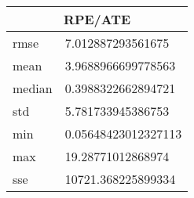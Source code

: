 \begin{table}[!ht] 
 \centering 
 \begin{tabular}{|l|l|} \hline 
 \multicolumn{2}{|c|}{RPE/ATE} \\ \hline 
 rmse & 7.012887293561675 \\ \hline 
mean & 3.9688966699778563 \\ \hline 
median & 0.3988322662894721 \\ \hline 
std & 5.781733945386753 \\ \hline 
min & 0.05648423012327113 \\ \hline 
max & 19.28771012868974 \\ \hline 
sse & 10721.368225899334 \\ \hline 
\end{tabular} 
 \end{table}